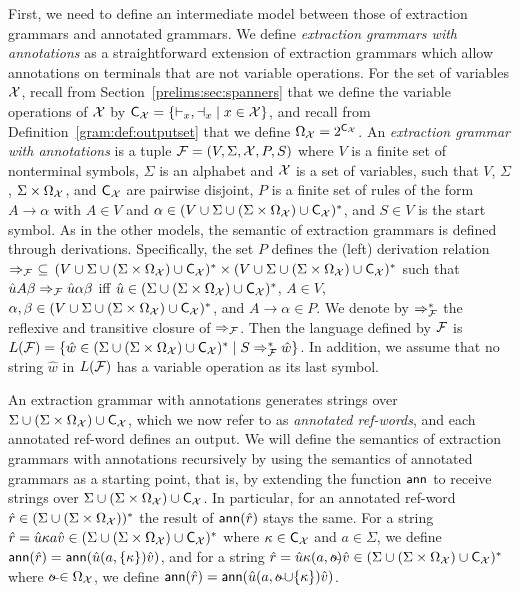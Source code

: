 First, we need to define an intermediate model between those of extraction grammars and annotated grammars. 
We define \emph{extraction grammars with annotations} as a straightforward
extension of extraction grammars which allow annotations on terminals that are
not variable operations. 
For the set of variables $\mathcal{X}$, recall from Section~\ref{prelims:sec:spanners} that
we define the variable operations  of $\mathcal{X}$ by $\textsf{C}_{\mathcal{X}} = \{ {\vdash_x},
{\dashv_x} \mid x\in \mathcal{X}\}$,
and recall from Definition~\ref{gram:def:outputset} that we define $\Omega_{\mathcal{X}} = 2^{\textsf{C}_{\mathcal{X}}}$. An \emph{extraction grammar with annotations} is a tuple
$\mathcal{F} = (V, \Sigma, \mathcal{X}, P, S)$ where 
$V$ is a finite set of nonterminal symbols, $\Sigma$ is an alphabet and $\mathcal{X}$ is a set of variables, such that $V$, $\Sigma$, $\Sigma\times\Omega_{\mathcal{X}}$, and $\textsf{C}_{\mathcal{X}}$ are pairwise disjoint, 
$P$ is a finite set of rules of the form $A \to \alpha$ with $A \in
V$ and $\alpha \in (V \cup \Sigma \cup (\Sigma\times\Omega_{\mathcal{X}}) \cup \textsf{C}_{\mathcal{X}})^*$, and $S \in V$ is the
start symbol. As in the other models, the semantic of extraction grammars is defined through derivations. Specifically,  the set $P$ defines the (left) derivation relation $\Rightarrow_{\mathcal{F}} \ \subseteq \, (V \cup \Sigma  \cup (\Sigma\times\Omega_{\mathcal{X}}) \cup \textsf{C}_{\mathcal{X}})^* \times (V \cup \Sigma  \cup (\Sigma\times\Omega_{\mathcal{X}}) \cup  \textsf{C}_{\mathcal{X}})^*$ such that $\hat{u} A \beta \Rightarrow_{\mathcal{F}} \hat{u} \alpha \beta$ iff $\hat{u} \in (\Sigma  \cup (\Sigma\times\Omega_{\mathcal{X}}) \cup \textsf{C}_{\mathcal{X}})^*$, $A \in V$, $\alpha, \beta \in (V \cup \Sigma \cup (\Sigma\times\Omega_{\mathcal{X}}) \cup \textsf{C}_{\mathcal{X}})^*$, and $A \rightarrow \alpha \in P$. We denote by $\Rightarrow_{\mathcal{F}}^*$ the reflexive and transitive closure of $\Rightarrow_{\mathcal{F}}$. Then the language defined by $\mathcal{F}$ is $L(\mathcal{F}) = \{\hat{w} \in (\Sigma \cup (\Sigma\times\Omega_{\mathcal{X}}) \cup \textsf{C}_{\mathcal{X}})^* \mid S \Rightarrow_{\mathcal{F}}^* \hat{w}\}$. In addition, we assume that no string $\hat{w}$ in $L(\mathcal{F})$ has a variable operation as its last symbol.

An extraction grammar with annotations generates
strings over $\Sigma \cup (\Sigma\times\Omega_{\mathcal{X}}) \cup \textsf{C}_{\mathcal{X}}$, which we now refer to as \emph{annotated ref-words}, and each annotated ref-word defines an output.
We will define the semantics of extraction grammars with annotations recursively by using the semantics of annotated grammars as a starting point, that is, by extending the function $\textsf{ann}$ to receive strings over $\Sigma \cup (\Sigma\times\Omega_{\mathcal{X}}) \cup \textsf{C}_{\mathcal{X}}$. In particular, for an annotated ref-word $\hat{r}\in (\Sigma \cup (\Sigma\times\Omega_{\mathcal{X}}))^*$ the result of $\textsf{ann}(\hat{r})$ stays the same. For a string $\hat{r} = \hat{u} \kappa a \hat{v} \in (\Sigma \cup (\Sigma\times\Omega_{\mathcal{X}}) \cup \textsf{C}_{\mathcal{X}})^*$ where $\kappa\in \textsf{C}_{\mathcal{X}}$ and $a\in\Sigma$, we define $\textsf{ann}(\hat{r}) = \textsf{ann}(\hat{u} (a,\{\kappa\}) \hat{v})$, and for a string $\hat{r} = \hat{u} \kappa (a,\oout) \hat{v} \in (\Sigma \cup (\Sigma\times\Omega_\var) \cup \captures_\var)^*$ where $\oout\in\Omega_\var$, we define $\ann(\hat{r}) = \ann(\hat{u} (a,\oout\cup\{\kappa\}) \hat{v})$.

